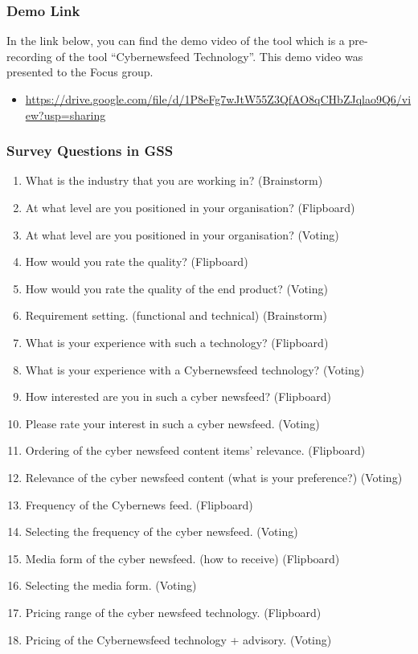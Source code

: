 \subsubsection{Demo Link}\label{Demo Link}
In the link below, you can find the demo video of the tool which is a pre-recording of the tool \enquote{Cybernewsfeed Technology}. This demo video was presented to the Focus group.
\begin{itemize}
    \item \url{https://drive.google.com/file/d/1P8eFg7wJtW55Z3QfAO8qCHbZJqlao9Q6/view?usp=sharing}
\end{itemize}



\subsubsection{Survey Questions in GSS}
\begin{enumerate}
    \item What is the industry that you are working in? (Brainstorm)
    \item At what level are you positioned in your organisation? (Flipboard)
    \item At what level are you positioned in your organisation? (Voting)
    \item How would you rate the quality? (Flipboard)
    \item How would you rate the quality of the end product? (Voting)
    \item Requirement setting. (functional and technical) (Brainstorm)
    \item What is your experience with such a technology? (Flipboard)
    \item What is your experience with a Cybernewsfeed technology? (Voting)
    \item How interested are you in such a cyber newsfeed? (Flipboard)
    \item Please rate your interest in such a cyber newsfeed. (Voting)
    \item Ordering of the cyber newsfeed content items' relevance. (Flipboard)
    \item Relevance of the cyber newsfeed content (what is your preference?) (Voting)
    \item Frequency of the Cybernews feed. (Flipboard)
    \item Selecting the frequency of the cyber newsfeed. (Voting)
    \item Media form of the cyber newsfeed. (how to receive) (Flipboard)
    \item Selecting the media form. (Voting)
    \item Pricing range of the cyber newsfeed technology. (Flipboard)
    \item Pricing of the Cybernewsfeed technology + advisory. (Voting)

\end{enumerate}


